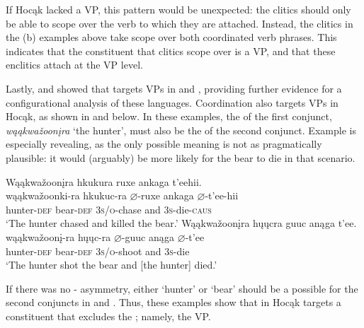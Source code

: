 \documentclass[output=paper]{LSP/langsci}
\begin{document}
If Hocąk lacked a VP, this pattern would be unexpected: the clitics should only be able to scope over the verb to which they are attached. Instead, the clitics in the (b) examples above take scope over both coordinated verb phrases. This indicates that the constituent that clitics scope over is a VP, and that these enclitics attach at the VP level. 
	
Lastly, \citet{Boyle2007} and \citet{West2003} showed that  targets VPs in  and , providing further evidence for a configurational analysis of these languages.  Coordination also targets VPs in Hocąk, as shown in  and  below. In these examples, the  of the first conjunct, \textit{wąąkwa\v{z}oon\k{i}ra} `the hunter', must also be the  of the second conjunct.  Example  is especially revealing, as the only possible meaning is not as pragmatically plausible: it would (arguably) be more likely for the bear to die in that scenario.

\begin{exe}
\ex\label{ex:jrs:35} 
\glll Wąąkwa\v{z}oon\k{i}ra 		hk{u}k{u}ra 			ruxe 				ank{a}ga 	t'eehii. \\
wąąkwa\v{z}oonk{i}-ra 	hk{u}k{u}c-ra 		$\varnothing$-ruxe  		ank{a}ga 	$\varnothing$-t'ee-hii \\
hunter-\textsc{def} 					bear-\textsc{def} 	\textsc{3s/o}-chase and 		\textsc{3s}-die-\textsc{caus} \\
\trans`The hunter chased and killed the bear.'
  \ex\label{ex:jrs:36} 
\glll Wąąkwa\v{z}oon\k{i}ra 		h\k{u}\k{u}cra 		guuc 				anąga 	t'ee. \\
wąąkwa\v{z}oon\k{i}-ra 	h\k{u}\k{u}c-ra 		$\varnothing$-guuc 			anąga 	$\varnothing$-t'ee \\
hunter-\textsc{def} 		bear-\textsc{def} 	\textsc{3s/o}-shoot 		and 		\textsc{3s}-die \\
\trans `The hunter shot the bear and [the hunter] died.'
\end{exe}
	
If there was no - asymmetry, either `hunter' or `bear' should be a possible  for the second conjuncts in  and . Thus, these examples show that  in Hocąk targets a constituent that excludes the ; namely, the VP.
\end{document}
